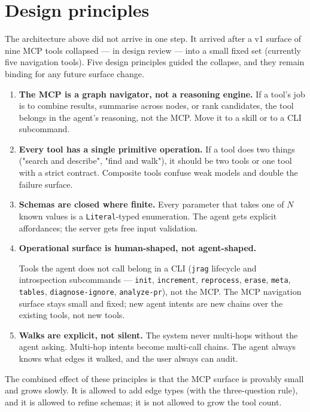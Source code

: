 \documentclass[11pt,a4paper]{article}
\begin{document}
\section{Design principles}
\label{sec:principles}

The architecture above did not arrive in one step. It arrived after a v1 surface of nine MCP tools collapsed --- in design review --- into a small fixed set (currently five navigation tools). Five design principles guided the collapse, and they remain binding for any future surface change.

\begin{enumerate}
\item \textbf{The MCP is a graph navigator, not a reasoning engine.} If a tool's job is to combine results, summarise across nodes, or rank candidates, the tool belongs in the agent's reasoning, not the MCP. Move it to a skill or to a CLI subcommand.
\item \textbf{Every tool has a single primitive operation.} If a tool does two things ("search and describe", "find and walk"), it should be two tools or one tool with a strict contract. Composite tools confuse weak models and double the failure surface.
\item \textbf{Schemas are closed where finite.} Every parameter that takes one of $N$ known values is a \texttt{Literal}-typed enumeration. The agent gets explicit affordances; the server gets free input validation.
\item \textbf{Operational surface is human-shaped, not agent-shaped.} {\sloppy Tools the agent does not call belong in a CLI (\texttt{jrag} lifecycle and introspection subcommands --- \texttt{init}, \texttt{increment}, \texttt{reprocess}, \texttt{erase}, \texttt{meta}, \texttt{tables}, \texttt{diagnose-ignore}, \texttt{analyze-pr}), not the MCP. The MCP navigation surface stays small and fixed; new agent intents are new chains over the existing tools, not new tools.\par}
\item \textbf{Walks are explicit, not silent.} The system never multi-hops without the agent asking. Multi-hop intents become multi-call chains. The agent always knows what edges it walked, and the user always can audit.
\end{enumerate}

The combined effect of these principles is that the MCP surface is provably small and grows slowly. It is allowed to add edge types (with the three-question rule), and it is allowed to refine schemas; it is not allowed to grow the tool count.
\end{document}
